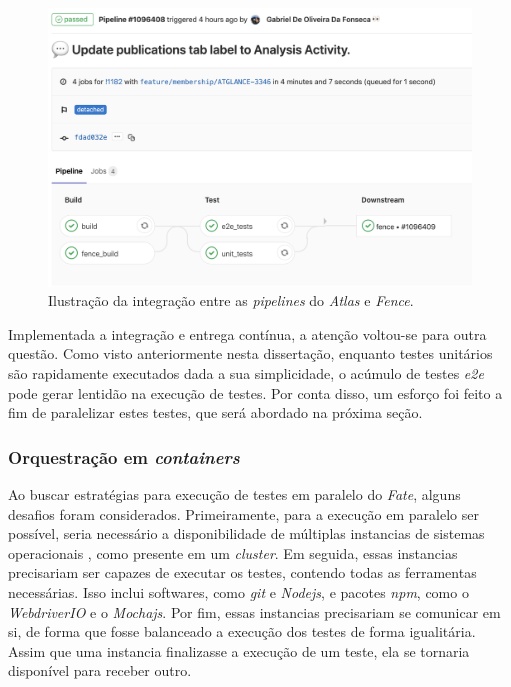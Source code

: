 \begin{figure}[H]
    \centering
    \includegraphics[width=13cm]{source/4-solucao/images/pipeline-update.png}
    \caption{Ilustração da integração entre as \emph{pipelines} do \emph{Atlas} e \emph{Fence}.}
    \label{fig:pipeline-update}
\end{figure}

Implementada a integração e entrega contínua, a atenção voltou-se para outra questão. Como visto anteriormente nesta dissertação, enquanto testes unitários são rapidamente executados dada a sua simplicidade, o acúmulo de testes \emph{e2e} pode gerar lentidão na execução de testes. Por conta disso, um esforço foi feito a fim de paralelizar estes testes, que será abordado na próxima seção.

\hypertarget{orquestracao-em-containers}{%
\subsubsection{\texorpdfstring{Orquestração em \emph{containers}}{Orquestração em containers}}\label{orquestracao-em-containers}}

Ao buscar estratégias para execução de testes em paralelo do \emph{Fate}, alguns desafios foram considerados. Primeiramente, para a execução em paralelo ser possível, seria necessário a disponibilidade de múltiplas instancias de sistemas operacionais , como presente em um \emph{cluster}. Em seguida, essas instancias precisariam ser capazes de executar os testes, contendo todas as ferramentas necessárias. Isso inclui softwares, como \emph{git} e \emph{Nodejs}, e pacotes \emph{npm}, como o \emph{WebdriverIO} e o \emph{Mochajs}. Por fim, essas instancias precisariam se comunicar em si, de forma que fosse balanceado a execução dos testes de forma igualitária. Assim que uma instancia finalizasse a execução de um teste, ela se tornaria disponível para receber outro.

